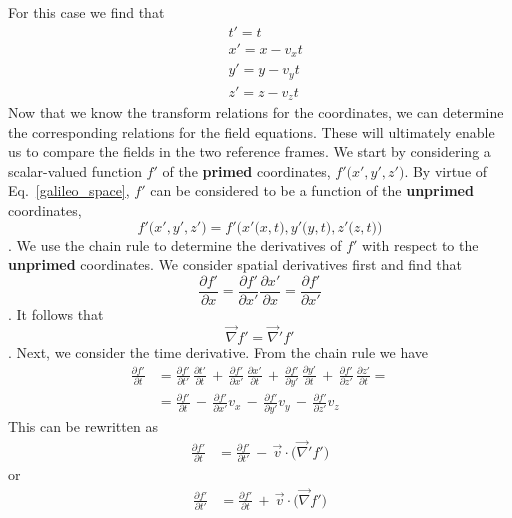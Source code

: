 \documentclass[11pt,a4paper,oneside]{book}
\numberwithin{equation}{section}
\theoremstyle{it}
\theoremstyle{definition}
\begin{document}
For this case we find that
  \begin{equation}\label{galileo_space}
	\begin{aligned}
		&t'=t \\[6pt]
		&x'=x - v_xt \\[6pt] 		
		&y'=y - v_yt \\[6pt] 		
		&z'=z - v_zt 	
	\end{aligned}
\end{equation} 
Now that we know the transform relations for the coordinates, we can determine the corresponding relations for the field equations. These will ultimately enable us to compare the fields in the two reference frames. We start by considering a scalar-valued function $f'$ of the \textbf{primed} coordinates, $f'\big(x',y',z'\big)$. By virtue of Eq.~\eqref{galileo_space}, $f'$ can be considered to be a function of the \textbf{unprimed} coordinates, $$f'\big(x',y',z'\big)=f'\big(x'\big(x,t\big),y'\big(y,t\big),z'\big(z,t\big)\big)$$.
We use the chain rule to determine the derivatives of $f'$ with respect to the \textbf{unprimed} coordinates. We consider spatial derivatives first and find that $$ \frac{\partial f'}{\partial x} =  \frac{\partial f'}{\partial x'} \frac{\partial x'}{\partial x} = \frac{\partial f'}{\partial x'}$$.
It follows that $$ \vec{\nabla}f'=\vec{\nabla}'f'$$.
Next, we consider the time derivative. From the chain rule we have 
  \begin{equation}
	\begin{aligned}
		\frac{\partial f'}{\partial t} &= \frac{\partial f'}{\partial t'}\,\frac{\partial t'}{\partial t}\,+\,\frac{\partial f'}{\partial x'}\,\frac{\partial x'}{\partial t}\,+\,\frac{\partial f'}{\partial y'}\,\frac{\partial y'}{\partial t}\,+\,\frac{\partial f'}{\partial z'}\,\frac{\partial z'}{\partial t} = \\[8pt]
		& = \frac{\partial f'}{\partial t}\,-\,\frac{\partial f'}{\partial x'} v_x\,-\,\frac{\partial f'}{\partial y'} v_y\,-\,\frac{\partial f'}{\partial z'} v_z
	\end{aligned}
\end{equation} 
This can be rewritten as 
  \begin{equation}\label{movref1}
	\begin{aligned}
		\frac{\partial f'}{\partial t} &= \frac{\partial f'}{\partial t'}\,-\,\vec{v}\cdot\big(\vec{\nabla}'f'\big)
	\end{aligned}
\end{equation} 
or
  \begin{equation}\label{movref2}
	\begin{aligned}
		\frac{\partial f'}{\partial t'} &= \frac{\partial f'}{\partial t}\,+\,\vec{v}\cdot\big(\vec{\nabla}f'\big)
	\end{aligned}
\end{equation} 
\end{document}
